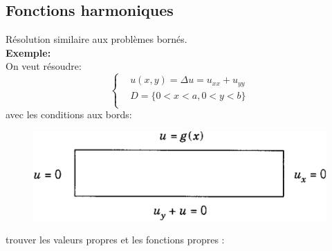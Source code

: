 \subsection*{Fonctions harmoniques}
Résolution similaire aux problèmes bornés.\\
\textbf{Exemple:}\\
On veut résoudre:
\begin{equation*}
    \left\{
    \begin{aligned}
         & u(x,y)=\Delta u=u_{xx}+u_{yy} \\
         & D=\{0<x<a,0<y<b\}             \\
    \end{aligned}
    \right.
\end{equation*}
avec les conditions aux bords:
\begin{figure}[H]
    \centering
    \includegraphics[width=0.75\linewidth]{images/semaine5_condi_bord.png}
\end{figure}
trouver les valeurs propres et les fonctions propres :
